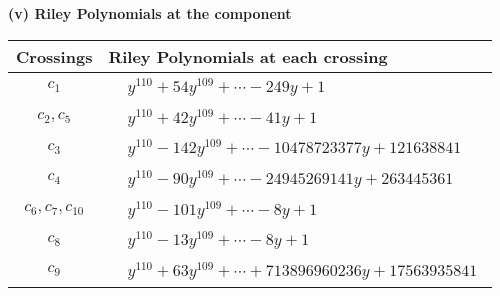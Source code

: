 \documentclass[1p]{elsarticle_modified}
\theoremstyle{definition}
\begin{document}
\newpage\renewcommand{\arraystretch}{1}
\flushleft \textbf{(v) Riley Polynomials at the component}\newline \\
\begin{tabular}{m{50pt}|m{274pt}}
Crossings & \hspace{64pt}Riley Polynomials at each crossing \\
\hline $$\begin{aligned}c_{1}\end{aligned}$$&$\begin{aligned}
&y^{110}+54 y^{109}+\cdots-249 y+1
\end{aligned}$\\
\hline $$\begin{aligned}c_{2},c_{5}\end{aligned}$$&$\begin{aligned}
&y^{110}+42 y^{109}+\cdots-41 y+1
\end{aligned}$\\
\hline $$\begin{aligned}c_{3}\end{aligned}$$&$\begin{aligned}
&y^{110}-142 y^{109}+\cdots-10478723377 y+121638841
\end{aligned}$\\
\hline $$\begin{aligned}c_{4}\end{aligned}$$&$\begin{aligned}
&y^{110}-90 y^{109}+\cdots-24945269141 y+263445361
\end{aligned}$\\
\hline $$\begin{aligned}c_{6},c_{7},c_{10}\end{aligned}$$&$\begin{aligned}
&y^{110}-101 y^{109}+\cdots-8 y+1
\end{aligned}$\\
\hline $$\begin{aligned}c_{8}\end{aligned}$$&$\begin{aligned}
&y^{110}-13 y^{109}+\cdots-8 y+1
\end{aligned}$\\
\hline $$\begin{aligned}c_{9}\end{aligned}$$&$\begin{aligned}
&y^{110}+63 y^{109}+\cdots+713896960236 y+17563935841
\end{aligned}$\\

\end{tabular}
\end{document}
